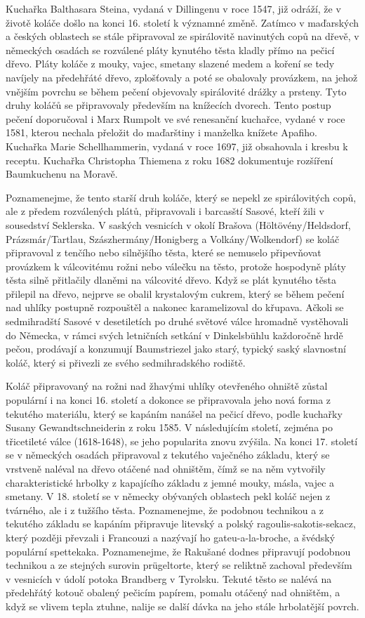 Kuchařka Balthasara Steina, vydaná v Dillingenu v roce 1547, již odráží,
že v životě koláče došlo na konci 16. století k významné změně. Zatímco
v maďarských a českých oblastech se stále připravoval ze spirálovitě
navinutých copů na dřevě, v německých osadách se rozválené pláty
kynutého těsta kladly přímo na pečicí dřevo. Pláty koláče z mouky,
vajec, smetany slazené medem a koření se tedy navíjely na předehřáté
dřevo, zplošťovaly a poté se obalovaly provázkem, na jehož vnějším
povrchu se během pečení objevovaly spirálovité drážky a prsteny. Tyto
druhy koláčů se připravovaly především na knížecích dvorech. Tento
postup pečení doporučoval i Marx Rumpolt ve své renesanční kuchařce,
vydané v roce 1581, kterou nechala přeložit do maďarštiny i manželka
knížete Apafiho. Kuchařka Marie Schellhammerin, vydaná v roce 1697, již
obsahovala i kresbu k receptu. Kuchařka Christopha Thiemena z roku 1682
dokumentuje rozšíření Baumkuchenu na Moravě.

Poznamenejme, že tento starší druh koláče, který se nepekl ze
spirálovitých copů, ale z předem rozválených plátů, připravovali i
barcasští Sasové, kteří žili v sousedství Seklerska. V saských vesnicích
v okolí Brašova (Höltövény/Heldsdorf, Prázsmár/Tartlau,
Szászhermány/Honigberg a Volkány/Wolkendorf) se koláč připravoval z
tenčího nebo silnějšího těsta, které se nemuselo připevňovat provázkem k
válcovitému rožni nebo válečku na těsto, protože hospodyně pláty těsta
silně přitlačily dlaněmi na válcovité dřevo. Když se plát kynutého těsta
přilepil na dřevo, nejprve se obalil krystalovým cukrem, který se během
pečení nad uhlíky postupně rozpouštěl a nakonec karamelizoval do
křupava. Ačkoli se sedmihradští Sasové v desetiletích po druhé světové
válce hromadně vystěhovali do Německa, v rámci svých letničních setkání
v Dinkelsbühlu každoročně hrdě pečou, prodávají a konzumují Baumstriezel
jako starý, typický saský slavnostní koláč, který si přivezli ze svého
sedmihradského rodiště.

Koláč připravovaný na rožni nad žhavými uhlíky otevřeného ohniště zůstal
populární i na konci 16. století a dokonce se připravovala jeho nová
forma z tekutého materiálu, který se kapáním nanášel na pečicí dřevo,
podle kuchařky Susany Gewandtschneiderin z roku 1585. V následujícím
století, zejména po třicetileté válce (1618-1648), se jeho popularita
znovu zvýšila. Na konci 17. století se v německých osadách připravoval z
tekutého vaječného základu, který se vrstveně naléval na dřevo otáčené
nad ohništěm, čímž se na něm vytvořily charakteristické hrbolky z
kapajícího základu z jemné mouky, másla, vajec a smetany. V 18. století
se v německy obývaných oblastech pekl koláč nejen z tvárného, ale i z
tužšího těsta. Poznamenejme, že podobnou technikou a z tekutého základu
se kapáním připravuje litevský a polský ragoulis-sakotis-sekacz, který
později převzali i Francouzi a nazývají ho gateu-a-la-broche, a švédský
populární spettekaka. Poznamenejme, že Rakušané dodnes připravují
podobnou technikou a ze stejných surovin prügeltorte, který se reliktně
zachoval především v vesnicích v údolí potoka Brandberg v Tyrolsku.
Tekuté těsto se nalévá na předehřátý kotouč obalený pečicím papírem,
pomalu otáčený nad ohništěm, a když se vlivem tepla ztuhne, nalije se
další dávka na jeho stále hrbolatější povrch.

